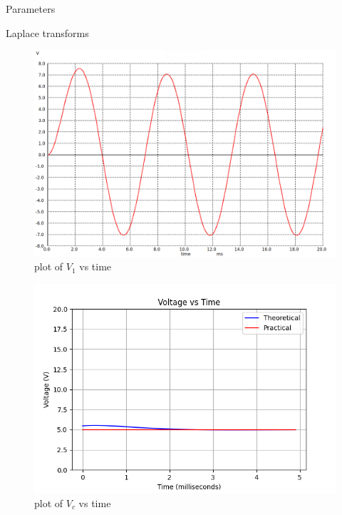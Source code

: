 \documentclass[journal,12pt,twocolumn]{IEEEtran}
\begin{document}
\begin{table}[ht]
       
    \caption{Parameters}
    \label{tab:Gate.ee.54.1}

\end{table}


\begin{table}[ht]
    
    \caption{Laplace transforms}
    \label{tab:Gate.ee.54.2}
\end{table}

\begin{figure}[htbp]
    \centering
    \includegraphics[width=1\columnwidth]{2023/EE/54/figs/fig1.png}
    \caption{plot of $V_1$ vs time}
\end{figure}

\begin{figure}[htbp]
    \centering
    \includegraphics[width=1\columnwidth]{2023/EE/54/figs/fig3.png}
    \caption{plot of $V_c$ vs time}
\end{figure}

\end{document}
